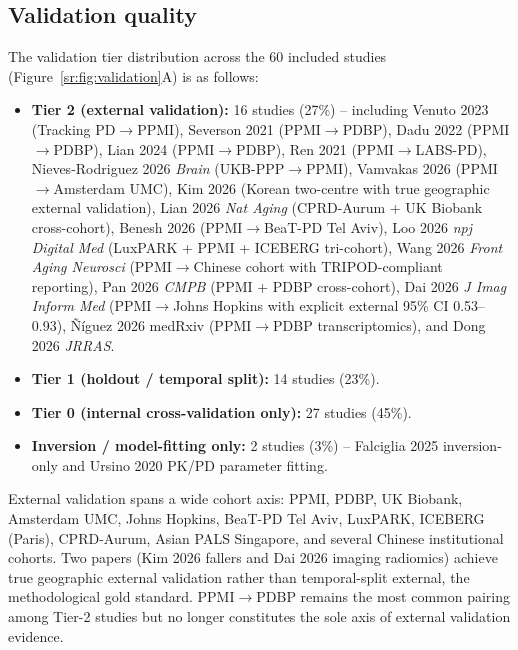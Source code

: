 \subsection{Validation quality}
\label{sr:sec:results:validation}

The validation tier distribution across the 60 included studies (Figure~\ref{sr:fig:validation}A) is as follows:
\begin{itemize}
    \item \textbf{Tier 2 (external validation):} 16 studies (27\%) -- including Venuto 2023 (Tracking PD$\rightarrow$PPMI), Severson 2021 (PPMI$\rightarrow$PDBP), Dadu 2022 (PPMI$\rightarrow$PDBP), Lian 2024 (PPMI$\rightarrow$PDBP), Ren 2021 (PPMI$\rightarrow$LABS-PD), Nieves-Rodriguez 2026 \textit{Brain} (UKB-PPP$\rightarrow$PPMI), Vamvakas 2026 (PPMI$\rightarrow$Amsterdam UMC), Kim 2026 (Korean two-centre with true geographic external validation), Lian 2026 \textit{Nat Aging} (CPRD-Aurum + UK Biobank cross-cohort), Benesh 2026 (PPMI$\rightarrow$BeaT-PD Tel Aviv), Loo 2026 \textit{npj Digital Med} (LuxPARK + PPMI + ICEBERG tri-cohort), Wang 2026 \textit{Front Aging Neurosci} (PPMI$\rightarrow$Chinese cohort with TRIPOD-compliant reporting), Pan 2026 \textit{CMPB} (PPMI + PDBP cross-cohort), Dai 2026 \textit{J Imag Inform Med} (PPMI$\rightarrow$Johns Hopkins with explicit external 95\% CI 0.53--0.93), \~{N}\'{i}guez 2026 medRxiv (PPMI$\rightarrow$PDBP transcriptomics), and Dong 2026 \textit{JRRAS}.
    \item \textbf{Tier 1 (holdout / temporal split):} 14 studies (23\%).
    \item \textbf{Tier 0 (internal cross-validation only):} 27 studies (45\%).
    \item \textbf{Inversion / model-fitting only:} 2 studies (3\%) -- Falciglia 2025 inversion-only and Ursino 2020 PK/PD parameter fitting.
\end{itemize}
\noindent External validation spans a wide cohort axis: PPMI, PDBP, UK Biobank, Amsterdam UMC, Johns Hopkins, BeaT-PD Tel Aviv, LuxPARK, ICEBERG (Paris), CPRD-Aurum, Asian PALS Singapore, and several Chinese institutional cohorts. Two papers (Kim 2026 fallers and Dai 2026 imaging radiomics) achieve true geographic external validation rather than temporal-split external, the methodological gold standard. PPMI$\rightarrow$PDBP remains the most common pairing among Tier-2 studies but no longer constitutes the sole axis of external validation evidence.

